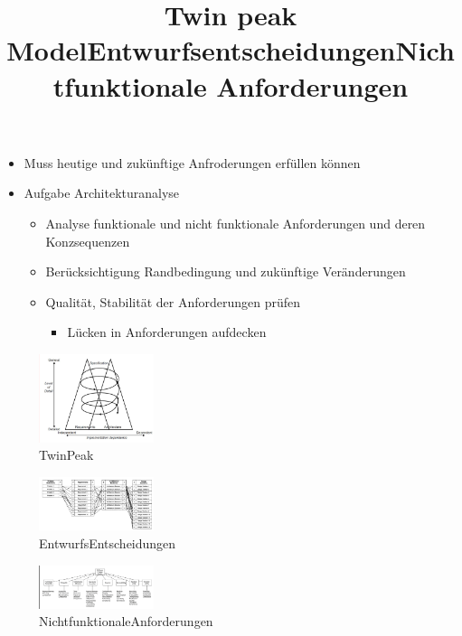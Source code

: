 \documentclass[../ZF_SWEN1.tex]{subfiles}
\begin{document}
\begin{itemize}
	\item Muss heutige und zukünftige Anfroderungen erfüllen können
	\item Aufgabe Architekturanalyse
	\begin{itemize}
		\item Analyse funktionale und nicht funktionale Anforderungen und deren Konzsequenzen
		\item  Berücksichtigung Randbedingung und zukünftige Veränderungen
		\item Qualität, Stabilität der Anforderungen prüfen
		\begin{itemize}
			\item Lücken in Anforderungen aufdecken
		\end{itemize}
	\end{itemize}
\end{itemize}


\title{Twin peak Model}
\begin{figure}[H]
\centering				\includegraphics[width=0.3\textwidth] {Resources/Images/TwinPeak.png}
\caption{\label{fig:TwinPeak}TwinPeak}
\end{figure}

\title{Entwurfsentscheidungen}
\begin{figure}[H]
\centering				\includegraphics[width=0.3\textwidth] {Resources/Images/EntwurfsEntscheidungen.png}
\caption{\label{fig:EntwurfsEntscheidungen}EntwurfsEntscheidungen}
\end{figure}

\title{Nichtfunktionale Anforderungen}
\begin{figure}[H]
\centering				\includegraphics[width=0.3\textwidth] {Resources/Images/NichtfunktionaleAnforderungen.png}
\caption{\label{fig:NichtfunktionaleAnforderungen}NichtfunktionaleAnforderungen}
\end{figure}
\end{document}
